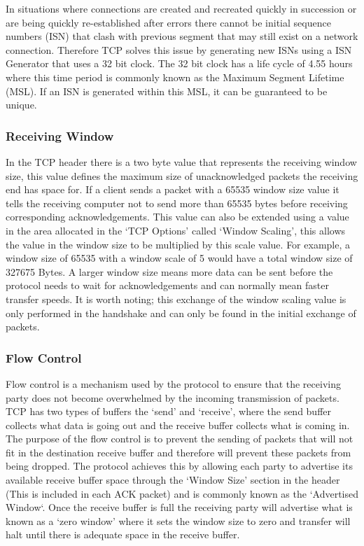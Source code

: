 In situations where connections are created and recreated quickly in succession or are being quickly re-established after errors there cannot be initial sequence numbers (ISN) that clash with previous segment that may still exist on a network connection. Therefore TCP solves this issue by generating new ISNs using a ISN Generator that uses a 32 bit clock. The 32 bit clock has a life cycle of 4.55 hours where this time period is commonly known as the Maximum Segment Lifetime (MSL). If an ISN is generated within this MSL, it can be guaranteed to be unique.

\subsubsection*{Receiving Window}
In the TCP header there is a two byte value that represents the receiving window size, this value defines the maximum size of unacknowledged packets the receiving end has space for. If a client sends a packet with a 65535 window size value it tells the receiving computer not to send more than 65535 bytes before receiving corresponding acknowledgements. This value can also be extended using a value in the area allocated in the `TCP Options' called `Window Scaling', this allows the value in the window size to be multiplied by this scale value. For example, a window size of 65535 with a window scale of 5 would have a total window size of 327675 Bytes. A larger window size means more data can be sent before the protocol needs to wait for acknowledgements and can normally mean faster transfer speeds. It is worth noting; this exchange of the window scaling value is only performed in the handshake and can only be found in the initial exchange of packets.

\subsubsection*{Flow Control}
Flow control is a mechanism used by the protocol to ensure that the receiving party does not become overwhelmed by the incoming transmission of packets. TCP has two types of buffers the `send' and `receive', where the send buffer collects what data is going out and the receive buffer collects what is coming in. The purpose of the flow control is to prevent the sending of packets that will not fit in the destination receive buffer and therefore will prevent these packets from being dropped. The protocol achieves this by allowing each party to advertise its available receive buffer space through the `Window Size' section in the header (This is included in each ACK packet) and is commonly known as the `Advertised Window`. Once the receive buffer is full the receiving party will advertise what is known as a `zero window' where it sets the window size to zero and transfer will halt until there is adequate space in the receive buffer.

